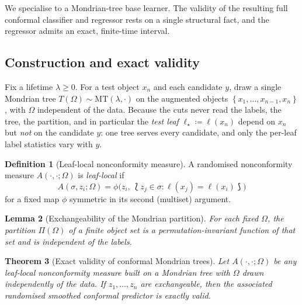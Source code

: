 \documentclass[twoside]{article}
\numberwithin{equation}{section}
\theoremstyle{plain}
\newtheorem{theorem}{Theorem}[section]
\newtheorem{lemma}[theorem]{Lemma}
\theoremstyle{definition}
\newtheorem{definition}[theorem]{Definition}
\theoremstyle{remark}
\newcommand{\set}[1]{\left\{#1\right\}}
\begin{document}
We specialise  to a Mondrian-tree base learner. The
validity of the resulting full conformal classifier and regressor rests on a single
structural fact, and the regressor admits an exact, finite-time interval.

\subsection{Construction and exact validity}\label{sec:trees-construction}

Fix a lifetime $\lambda \ge 0$. For a test object $x_n$ and each candidate
$y$, draw a single Mondrian tree $T(\Omega) \sim
\mathrm{MT}(\lambda, \cdot)$ on the augmented objects $\set{x_1, \dots,
x_{n-1}, x_n}$, with $\Omega$ independent of the data. Because the
cuts never read the labels, the tree, the partition, and in particular the
\emph{test leaf} $\ell_{\star} \coloneqq \ell(x_n)$ depend on $x_n$ but
\emph{not} on the candidate $y$: one tree serves every candidate, and only
the per-leaf label statistics vary with $y$.

\begin{definition}[Leaf-local nonconformity measure]\label{def:leaf-local}
A randomised nonconformity measure $A(\cdot, \cdot; \Omega)$ is
\emph{leaf-local} if
\begin{equation}\label{eq:leaf-local}
  A\!\left(\sigma, z_i ; \Omega\right)
  = \phi\bigl(z_i,\,
      \lbag z_j \in \sigma : \ell(x_j) = \ell(x_i) \rbag\bigr)
\end{equation}
for a fixed map $\phi$ symmetric in its second (multiset) argument.
\end{definition}

\begin{lemma}[Exchangeability of the Mondrian partition]\label{lem:mondrian-exch}
For each fixed $\Omega$, the partition $\Pi(\Omega)$ of a finite object
set is a permutation-invariant function of that set and is independent of the
labels.
\end{lemma}

\begin{theorem}[Exact validity of conformal Mondrian trees]\label{thm:tree-validity}
Let $A(\cdot, \cdot; \Omega)$ be any leaf-local nonconformity measure built on
a Mondrian tree with $\Omega$ drawn independently of the data. If $z_1,
\dots, z_n$ are exchangeable, then the associated randomised smoothed
conformal predictor is exactly valid.
\end{theorem}
\end{document}
